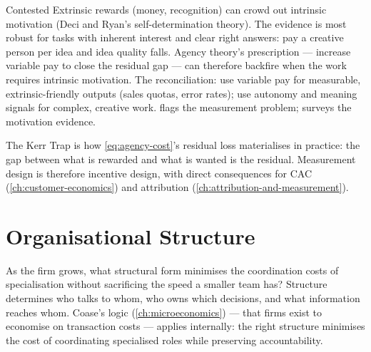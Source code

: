 \begin{admonition}{Contested}
Extrinsic rewards (money, recognition) can crowd out intrinsic motivation (Deci and Ryan's self-determination theory). The evidence is most robust for tasks with inherent interest and clear right answers: pay a creative person per idea and idea quality falls. Agency theory's prescription --- increase variable pay to close the residual gap --- can therefore backfire when the work requires intrinsic motivation. The reconciliation: use variable pay for measurable, extrinsic-friendly outputs (sales quotas, error rates); use autonomy and meaning signals for complex, creative work. \textcite{kerr1975folly} flags the measurement problem; \textcite{robbins2022} surveys the motivation evidence.
\end{admonition}

The Kerr Trap is how \cref{eq:agency-cost}'s residual loss materialises in practice: the gap between what is rewarded and what is wanted is the residual. Measurement design is therefore incentive design, with direct consequences for CAC (\cref{ch:customer-economics}) and attribution (\cref{ch:attribution-and-measurement}).

\section{Organisational Structure}\label{sec:org-structure}

As the firm grows, what structural form minimises the coordination costs of specialisation without sacrificing the speed a smaller team has? Structure determines who talks to whom, who owns which decisions, and what information reaches whom. Coase's logic (\cref{ch:microeconomics}) --- that firms exist to economise on transaction costs --- applies internally: the right structure minimises the cost of coordinating specialised roles while preserving accountability.

